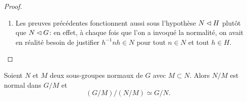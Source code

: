 \begin{proof}
\begin{enumerate}
            Le premier théorème d'isomorphisme implique alors que \( H/\Kernel f\simeq \Image f\), c'est-à-dire
            \begin{equation}
                H/N\cap H\simeq HN/N.
            \end{equation}
       \item
          Les preuves précédentes fonctionnent aussi sous l'hypothèse \( N \lhd H \) plutôt que \( N \lhd G \): en effet, à chaque fois que l'on a invoqué la normalité, on avait en réalité besoin de justifier \( h^{-1}nh \in N \) pour tout \( n \in N \) et tout \( h \in H \).
    \end{enumerate}
\end{proof}

\begin{theorem}  \label{ThoezgBep}
    Soient \( N\) et \( M\) deux sous-groupes normaux de \( G\) avec \( M\subset N\). Alors \( N/M\) est normal dans \( G/M\) et
    \begin{equation}
        (G/M)/(N/M)\simeq G/N.
    \end{equation}
\end{theorem}

